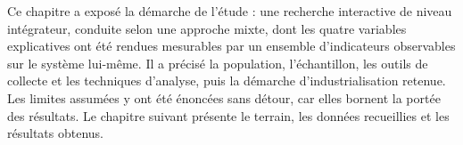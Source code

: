 \conclchap

Ce chapitre a exposé la démarche de l'étude : une recherche interactive de
niveau intégrateur, conduite selon une approche mixte, dont les quatre variables
explicatives ont été rendues mesurables par un ensemble d'indicateurs
observables sur le système lui-même. Il a précisé la population, l'échantillon,
les outils de collecte et les techniques d'analyse, puis la démarche
d'industrialisation retenue. Les limites assumées y ont été énoncées sans
détour, car elles bornent la portée des résultats. Le chapitre suivant présente
le terrain, les données recueillies et les résultats obtenus.
